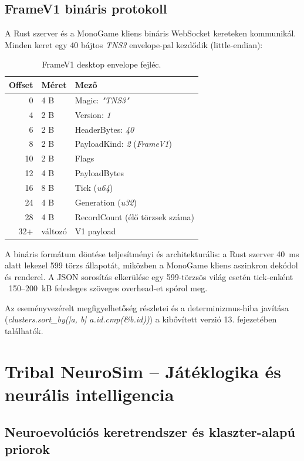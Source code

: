 \section{FrameV1 bináris protokoll}

A Rust szerver és a MonoGame kliens bináris WebSocket kereteken kommunikál. Minden keret egy 40 bájtos \textit{TNS3} envelope-pal kezdődik (little-endian):

\begin{table}[H]
\centering
\caption{FrameV1 desktop envelope fejléc.}
\label{tab:framev1-envelope}
\begin{tabular}{rll}
\hline
\textbf{Offset} & \textbf{Méret} & \textbf{Mező} \\
\hline
0  & 4 B & Magic: \textit{"TNS3"} \\
4  & 2 B & Version: \textit{1} \\
6  & 2 B & HeaderBytes: \textit{40} \\
8  & 2 B & PayloadKind: \textit{2} (\textit{FrameV1}) \\
10 & 2 B & Flags \\
12 & 4 B & PayloadBytes \\
16 & 8 B & Tick (\textit{u64}) \\
24 & 4 B & Generation (\textit{u32}) \\
28 & 4 B & RecordCount (élő törzsek száma) \\
32+ & változó & V1 payload \\
\hline
\end{tabular}
\end{table}

A bináris formátum döntése teljesítményi és architekturális: a Rust szerver 40~ms alatt lekezel 599 törzs állapotát, miközben a MonoGame kliens aszinkron dekódol és renderel. A JSON sorosítás elkerülése egy 599-törzsös világ esetén tick-enként ~150--200~kB felesleges szöveges overhead-et spórol meg.

Az eseményvezérelt megfigyelhetőség részletei és a determinizmus-hiba javítása (\textit{clusters.sort\_by(|a, b| a.id.cmp(\&b.id))}) a kibővített verzió 13. fejezetében találhatók.

\chapter{Tribal NeuroSim -- Játéklogika és neurális intelligencia}

\section{Neuroevolúciós keretrendszer és klaszter-alapú priorok}

